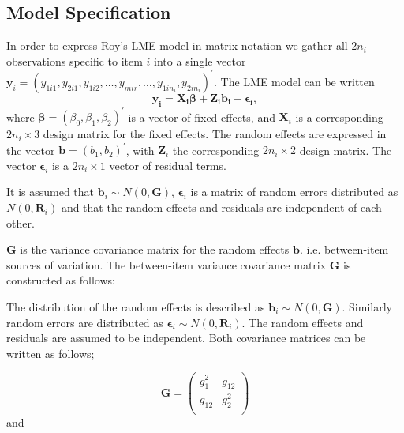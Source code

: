 \documentclass[12pt, a4paper]{report}
\theoremstyle{plain}
\theoremstyle{definition}
\theoremstyle{remark}
\begin{document}
		


\subsection{Model Specification}
In order to express Roy's LME model in matrix notation we gather all $2n_i$ observations specific to item $i$ into a single vector  $\boldsymbol{y}_{i} = (y_{1i1},y_{2i1},y_{1i2},\ldots,y_{mir},\ldots,y_{1in_{i}},y_{2in_{i}})^\prime.$ The LME model can be written
\[
\boldsymbol{y_{i}} = \boldsymbol{X_{i}\beta} + \boldsymbol{Z_{i}b_{i}} + \boldsymbol{\epsilon_{i}},
\]
where $\boldsymbol{\beta}=(\beta_0,\beta_1,\beta_2)^\prime$ is a vector of fixed effects, and $\boldsymbol{X}_i$ is a corresponding $2n_i\times 3$ design matrix for the fixed effects. The random effects are expressed in the vector $\boldsymbol{b}=(b_1,b_2)^\prime$, with $\boldsymbol{Z}_i$ the corresponding $2n_i\times 2$ design matrix. The vector $\boldsymbol{\epsilon}_i$ is a $2n_i\times 1$ vector of residual terms.

It is assumed that $\boldsymbol{b}_i \sim N(0,\boldsymbol{G})$, $\boldsymbol{\epsilon}_i$ is a matrix of random errors distributed as $N(0,\boldsymbol{R}_i)$ and that the random effects and residuals are independent of each other.


$\boldsymbol{G}$ is the variance covariance matrix for the random effects $\boldsymbol{b}$.
i.e. between-item sources of variation. The between-item variance covariance matrix $\boldsymbol{G}$ is constructed as follows:

The distribution of the random effects is described as $\boldsymbol{b}_i \sim N(0,\boldsymbol{G})$. Similarly  random errors are distributed as $\boldsymbol{\epsilon}_i \sim N(0,\boldsymbol{R}_i)$. The random effects and residuals are assumed to be independent. Both covariance matrices can be written as follows;


\[ \boldsymbol{G} =\left(
\begin{array}{cc}
g^2_1  & g_{12} \\
g_{12} & g^2_2 \\
\end{array}
\right) \]
and
\end{document}
